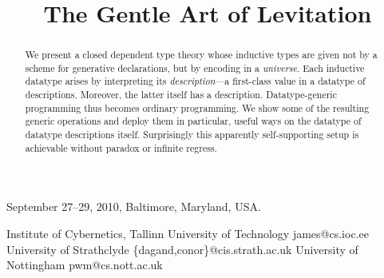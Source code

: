 \documentclass[authoryear]{sigplanconf}
\begin{document}
\ColourEpigram

 {September 27--29, 2010, Baltimore, Maryland, USA.}






\title{The Gentle Art of Levitation}


           {Institute of Cybernetics, Tallinn University of Technology}
           {james@cs.ioc.ee}
           {University of Strathclyde}
           {\{dagand,conor\}@cis.strath.ac.uk}
           {University of Nottingham}
           {pwm@cs.nott.ac.uk}


\maketitle




\begin{abstract}
  We present a closed dependent type theory whose inductive types
  are given not by a scheme for generative declarations,
  but by encoding in a \emph{universe}. Each inductive datatype arises
  by interpreting its \emph{description}---a
  first-class value in a datatype of descriptions. Moreover, the
  latter itself has a description. Datatype-generic programming thus
  becomes ordinary programming. We show some of the resulting generic
  operations and deploy them in particular, useful ways on the
  datatype of datatype descriptions itself. Surprisingly this
  apparently self-supporting setup is achievable without paradox or
  infinite regress.
\end{abstract}



\end{document}
